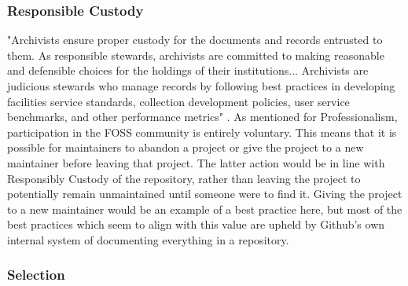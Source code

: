 \subsubsection{Responsible Custody}

"Archivists ensure proper custody for the documents and records entrusted to them. As responsible stewards, archivists are committed to making reasonable and defensible choices for the holdings of their institutions... Archivists are judicious stewards who manage records by following best practices in developing facilities service standards, collection development policies, user service benchmarks, and other performance metrics" \cite{rubin2016foundationslis}. As mentioned for Professionalism, participation in the FOSS community is entirely voluntary. This means that it is possible for maintainers to abandon a project or give the project to a new maintainer before leaving that project. The latter action would be in line with Responsibly Custody of the repository, rather than leaving the project to potentially remain unmaintained until someone were to find it. Giving the project to a new maintainer would be an example of a best practice here, but most of the best practices which seem to align with this value are upheld by Github's own internal system of documenting everything in a repository. 

\subsubsection{Selection}

